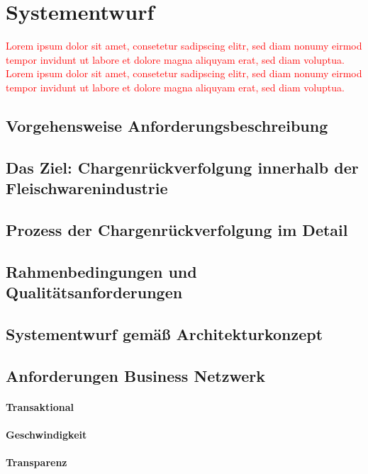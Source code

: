 \section{Systementwurf}
\textcolor{red}{Lorem ipsum dolor sit amet, consetetur sadipscing elitr, sed diam nonumy eirmod tempor invidunt ut labore et dolore magna aliquyam erat, sed diam voluptua. Lorem ipsum dolor sit amet, consetetur sadipscing elitr, sed diam nonumy eirmod tempor invidunt ut labore et dolore magna aliquyam erat, sed diam voluptua.}

\subsection{Vorgehensweise Anforderungsbeschreibung}

\subsection{Das Ziel: Chargenrückverfolgung innerhalb der Fleischwarenindustrie}

\subsection{Prozess der Chargenrückverfolgung im Detail}

\subsection{Rahmenbedingungen und Qualitätsanforderungen}

\subsection{Systementwurf gemäß Architekturkonzept}

\subsection{Anforderungen Business Netzwerk}

\paragraph{Transaktional}

\paragraph{Geschwindigkeit}

\paragraph{Transparenz}

